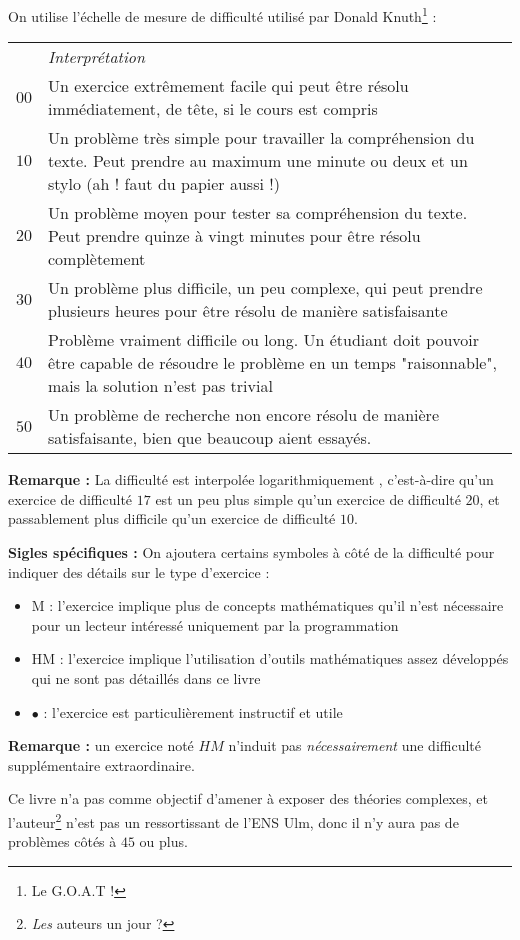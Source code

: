 \documentclass[../main.tex]{subfiles}
\begin{document}
On utilise l'échelle de mesure de difficulté utilisé par Donald Knuth\footnote{Le G.O.A.T !}\cite{TAOCP} : 
\begin{center}
	\begin{tabular}{cp{}}
	& \textit{Interprétation} \\
	$00$ & Un exercice extrêmement facile qui peut être résolu immédiatement, de tête, si le cours est compris \\
	$10$ & Un problème très simple pour travailler la compréhension du texte. Peut prendre au maximum une minute ou deux et un stylo (ah ! faut du papier aussi !)\\
	$20$ & Un problème moyen pour tester sa compréhension du texte. Peut prendre quinze à vingt minutes pour être résolu complètement \\
	$30$ & Un problème plus difficile, un peu complexe, qui peut prendre plusieurs heures pour être résolu de manière satisfaisante \\
	$40$ & Problème vraiment difficile ou long. Un étudiant doit pouvoir être capable de résoudre le problème en un temps "raisonnable", mais la solution n'est pas trivial \\
	$50$ & Un problème de recherche non encore résolu de manière satisfaisante, bien que beaucoup aient essayés.
	\end{tabular}
\end{center}
\textbf{Remarque : } La difficulté est interpolée \og logarithmiquement \fg, c'est-à-dire qu'un exercice de difficulté $17$ est un peu plus simple qu'un exercice de difficulté $20$, et passablement plus difficile qu'un exercice de difficulté $10$.

\textbf{Sigles spécifiques :} On ajoutera certains symboles à côté de la difficulté pour indiquer des détails sur le type d'exercice :
\begin{itemize}
	\item M : l'exercice implique plus de concepts mathématiques qu'il n'est nécessaire pour un lecteur intéressé uniquement par la programmation
	\item HM : l'exercice implique l'utilisation d'outils mathématiques assez développés qui ne sont pas détaillés dans ce livre
	\item $\bullet$ : l'exercice est particulièrement instructif et utile
\end{itemize}
\textbf{Remarque :} un exercice noté $HM$ n'induit pas \textit{nécessairement} une difficulté supplémentaire extraordinaire.

Ce livre n'a pas comme objectif d'amener à exposer des théories complexes, et l'auteur\footnote{\textit{Les} auteurs un jour ?} n'est pas un ressortissant de l'ENS Ulm, donc il n'y aura pas de problèmes côtés à $45$ ou plus.
\end{document}
